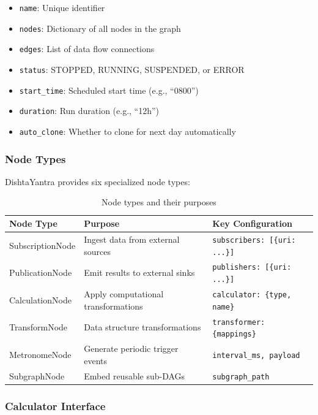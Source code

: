 \documentclass[11pt,a4paper]{article}
\begin{document}
\begin{itemize}
    \item \texttt{name}: Unique identifier
    \item \texttt{nodes}: Dictionary of all nodes in the graph
    \item \texttt{edges}: List of data flow connections
    \item \texttt{status}: STOPPED, RUNNING, SUSPENDED, or ERROR
    \item \texttt{start\_time}: Scheduled start time (e.g., ``0800'')
    \item \texttt{duration}: Run duration (e.g., ``12h'')
    \item \texttt{auto\_clone}: Whether to clone for next day automatically
\end{itemize}

\subsubsection{Node Types}

DishtaYantra provides six specialized node types:

\begin{table}[H]
\centering
\caption{Node types and their purposes}
\begin{tabular}{@{}lll@{}}
\toprule
\textbf{Node Type} & \textbf{Purpose} & \textbf{Key Configuration} \\
\midrule
SubscriptionNode & Ingest data from external sources & \texttt{subscribers: [\{uri: ...\}]} \\
PublicationNode & Emit results to external sinks & \texttt{publishers: [\{uri: ...\}]} \\
CalculationNode & Apply computational transformations & \texttt{calculator: \{type, name\}} \\
TransformNode & Data structure transformations & \texttt{transformer: \{mappings\}} \\
MetronomeNode & Generate periodic trigger events & \texttt{interval\_ms, payload} \\
SubgraphNode & Embed reusable sub-DAGs & \texttt{subgraph\_path} \\
\bottomrule
\end{tabular}
\end{table}

\subsubsection{Calculator Interface}
\end{document}
